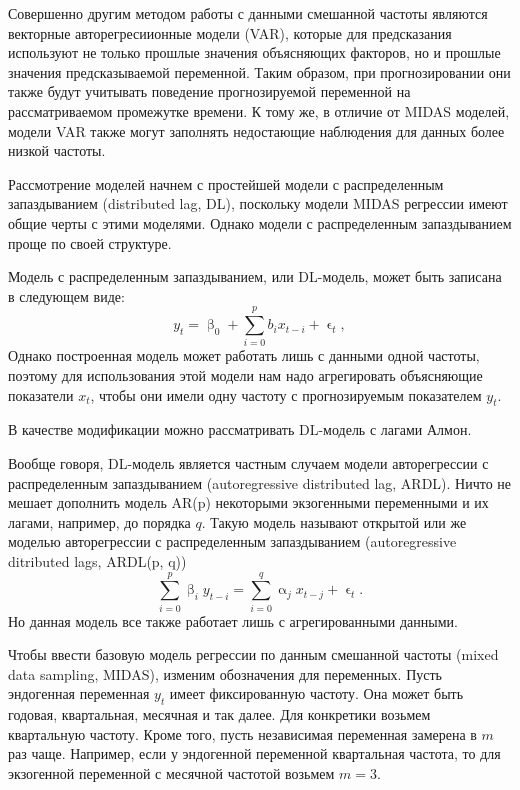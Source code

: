 \documentclass[a4paper, 12pt]{extarticle}
\renewcommand{\alpha}{\upalpha}
\renewcommand{\beta}{\upbeta}
\renewcommand{\epsilon}{\upvarepsilon}
\begin{document}
	Совершенно другим методом работы с данными смешанной частоты являются векторные авторегресиионные модели (VAR), которые для предсказания используют не только прошлые значения объясняющих факторов, но и прошлые значения предсказываемой переменной. Таким образом, при прогнозировании они также будут учитывать поведение прогнозируемой переменной на рассматриваемом промежутке времени. К тому же, в отличие от MIDAS моделей, модели VAR также могут заполнять недостающие наблюдения для данных более низкой частоты.
	
	Рассмотрение моделей начнем с простейшей модели с распределенным запаздыванием (distributed lag, DL), поскольку модели MIDAS регрессии имеют общие черты с этими моделями. Однако модели с распределенным запаздыванием проще по своей структуре. 
	
	Модель с распределенным запаздыванием, или DL-модель, может быть записана в следующем виде:
	\begin{equation}
		y_t = \beta_0 + \sum_{i=0}^{p} b_i x_{t-i} + \epsilon_t,
	\end{equation}
	Однако построенная модель может работать лишь с данными одной частоты, поэтому для использования этой модели нам надо агрегировать объясняющие показатели $x_t$, чтобы они имели одну частоту с прогнозируемым показателем $y_t$. 
	
	В качестве модификации можно рассматривать DL-модель с лагами Алмон.
	
	Вообще говоря, DL-модель является частным случаем модели авторегрессии с распределенным запаздыванием (autoregressive distributed lag, ARDL).
	Ничто не мешает дополнить модель AR(p) некоторыми экзогенными переменными и их лагами, например, до порядка $q$. Такую модель называют открытой или же моделью авторегрессии с распределенным запаздыванием (autoregressive ditributed lags, ARDL(p, q))
	\begin{equation}
		\sum_{i=0}^{p} \beta_i y_{t-i}= \sum_{i=0}^{q}\alpha_j x_{t-j}+ \epsilon_t.
	\end{equation}
	Но данная модель все также работает лишь с агрегированными данными.
	
	Чтобы ввести базовую модель регрессии по данным смешанной частоты (mixed data sampling, MIDAS), изменим обозначения для переменных. Пусть эндогенная переменная $y_t$ имеет фиксированную частоту. Она может быть годовая, квартальная, месячная и так далее. Для конкретики возьмем квартальную частоту. Кроме того, пусть независимая переменная замерена в $m$ раз чаще. Например, если у эндогенной переменной квартальная частота, то для экзогенной переменной с месячной частотой возьмем $m=3$.
	
\end{document}
